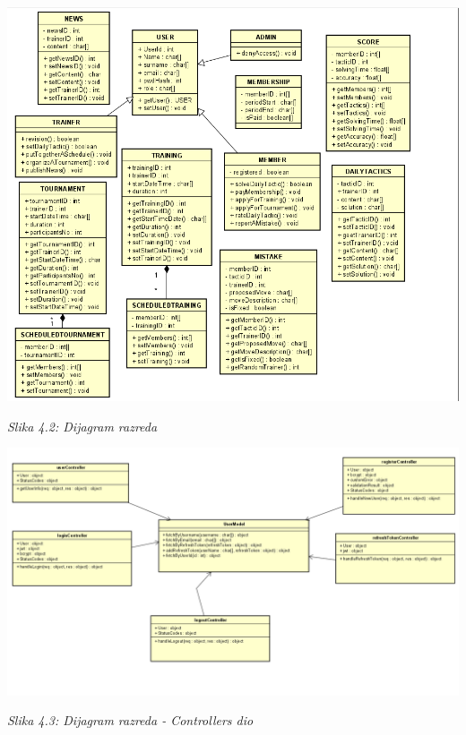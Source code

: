 \documentclass{article}
\begin{document}
	\includegraphics[width=\columnwidth]{slike/dijagramRazreda.PNG}
		\begin{center}
			\textit{Slika 4.2: Dijagram razreda}
		\end{center}
	
	\eject
	
	\includegraphics[width=\columnwidth]{controllers}
		\begin{center}
			\textit{Slika 4.3: Dijagram razreda - Controllers dio}
		\end{center}
\end{document}
